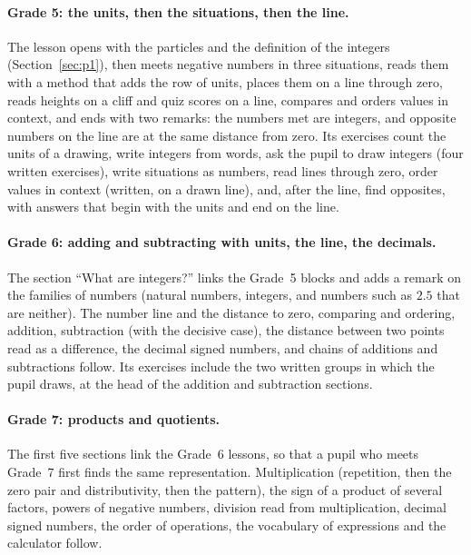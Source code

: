 \documentclass[11pt,a4paper]{article}
\theoremstyle{definition}
\begin{document}
\paragraph{Grade 5: the units, then the situations, then the line.} The lesson opens with the particles and the definition of the integers (Section~\ref{sec:p1}), then meets negative numbers in three situations, reads them with a method that adds the row of units, places them on a line through zero, reads heights on a cliff and quiz scores on a line, compares and orders values in context, and ends with two remarks: the numbers met are integers, and opposite numbers on the line are at the same distance from zero. Its exercises count the units of a drawing, write integers from words, ask the pupil to draw integers (four written exercises), write situations as numbers, read lines through zero, order values in context (written, on a drawn line), and, after the line, find opposites, with answers that begin with the units and end on the line.

\paragraph{Grade 6: adding and subtracting with units, the line, the decimals.} The section ``What are integers?'' links the Grade~5 blocks and adds a remark on the families of numbers (natural numbers, integers, and numbers such as $2.5$ that are neither). The number line and the distance to zero, comparing and ordering, addition, subtraction (with the decisive case), the distance between two points read as a difference, the decimal signed numbers, and chains of additions and subtractions follow. Its exercises include the two written groups in which the pupil draws, at the head of the addition and subtraction sections.

\paragraph{Grade 7: products and quotients.} The first five sections link the Grade~6 lessons, so that a pupil who meets Grade~7 first finds the same representation. Multiplication (repetition, then the zero pair and distributivity, then the pattern), the sign of a product of several factors, powers of negative numbers, division read from multiplication, decimal signed numbers, the order of operations, the vocabulary of expressions and the calculator follow.
\end{document}
